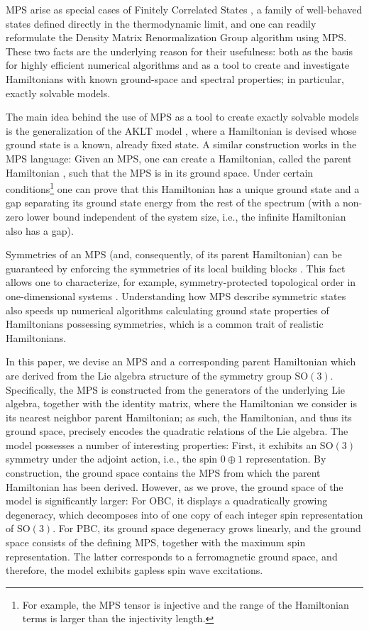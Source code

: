 \documentclass[a4paper]{article}
\theoremstyle{definition}
\begin{document}
MPS arise as special cases of Finitely Correlated States \cite{Fannes1992}, a family of well-behaved states defined directly in the thermodynamic limit, and one can readily reformulate the Density Matrix Renormalization Group algorithm \cite{White1992} using MPS. These two facts are the underlying reason for their usefulness: both as the basis for highly efficient numerical algorithms and as a tool to create and investigate Hamiltonians with known ground-space and spectral properties; in particular, exactly solvable models. 

The main idea behind the use of MPS as a tool to create exactly solvable models is the generalization of the AKLT model \cite{Affleck1988}, where a Hamiltonian is devised whose ground state is a known, already fixed state. A similar construction works in the MPS language: Given an MPS, one can create a Hamiltonian, called the parent Hamiltonian \cite{Fannes1992}, such that the MPS is in its ground space. Under certain conditions\footnote{For example, the MPS tensor is injective and the range of the Hamiltonian terms is larger than the injectivity length.} one can prove that this Hamiltonian has a unique ground state and a gap separating its ground state energy from the rest of the spectrum \cite{Fannes1992,Nachtergaele1996} (with a non-zero lower bound independent of the system size, i.e., the infinite Hamiltonian also has a gap). 

Symmetries of an MPS (and, consequently, of its parent Hamiltonian) can be guaranteed by enforcing the symmetries of its local building blocks \cite{Fannes1992,Perez-Garcia2007}. This fact allows one to characterize, for example, symmetry-protected topological order in one-dimensional systems \cite{1010.3732,Chen2011a}. Understanding how MPS describe symmetric states also speeds up numerical algorithms calculating ground state properties of Hamiltonians possessing symmetries, which is a common trait of realistic Hamiltonians.  

In this paper, we devise an MPS and a corresponding parent Hamiltonian which are
derived from the Lie algebra structure of the symmetry group $\mathrm{SO}(3)$.
Specifically, the MPS is constructed from the generators of the underlying Lie algebra, 
together with the identity matrix, where the Hamiltonian we consider is its nearest
neighbor parent Hamiltonian; as such, the Hamiltonian, and thus its ground
space, precisely encodes the quadratic relations of the Lie algebra.  The model
possesses a number of interesting properties: First, it exhibits an
$\mathrm{SO}(3)$ symmetry under the adjoint action, i.e., the spin $0\oplus 1$
representation. By construction, the ground space contains the MPS from which
the parent Hamiltonian has been derived. However, as we prove, the ground space
of the model is significantly larger: For OBC, it displays a quadratically
growing degeneracy, which decomposes into of one copy of each integer spin
representation of $\mathrm{SO}(3)$. For PBC, its ground space degeneracy grows
linearly, and the ground space consists of the defining MPS, together with the
maximum spin representation. The latter corresponds to a ferromagnetic ground
space, and therefore, the model exhibits gapless spin wave excitations. 
\end{document}
